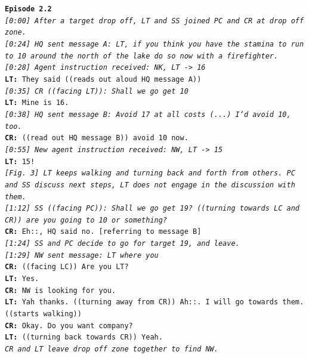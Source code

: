 \noindent\texttt{\textbf{Episode 2.2}\\
\emph{[0:00] After a target drop off, LT and SS joined PC and CR at drop off zone.} \\
\emph{ [0:24] HQ sent message A: LT, if you think you have the stamina to run to 10 around the north of the lake do so now with a firefighter. }\\
\emph{ [0:28] Agent instruction received:  NK, LT -> 16 }\\
\textbf{LT:} They said ((reads out aloud HQ message A)) \\
\emph{[0:35] CR ((facing LT)): Shall we go get 10}\\
\textbf{LT:} Mine is 16. \\
\emph{[0:38] HQ sent message B: Avoid 17 at all costs (...) I`d avoid 10, too.}\\
\textbf{CR:} ((read out HQ message B)) avoid 10 now. \\
\emph{[0:55] New agent instruction received: NW, LT -> 15}\\
\textbf{LT:} 15!\\
\emph{[Fig. 3] LT keeps walking and turning back and forth from others. PC and SS discuss next steps, LT does not engage in the discussion with them. }\\
\emph{[1:12] SS ((facing PC)): Shall we go get 19? ((turning towards LC and CR)) are you going to 10 or something? }\\
\textbf{CR:} Eh::, HQ said no. [referring to message B]\\
\emph{[1:24] SS and PC decide to go for target 19, and leave.}\\
\emph{[1:29] NW sent message: LT where you}\\
\textbf{CR:} ((facing LC)) Are you LT? \\
\textbf{LT:} Yes. \\
\textbf{CR:} NW is looking for you. \\ 
\textbf{LT:} Yah thanks. ((turning away from CR)) Ah::. I will go towards them.  ((starts walking)) \\
\textbf{CR:} Okay. Do you want company?\\
\textbf{LT:} ((turning back towards CR)) Yeah. \\
\emph{CR and LT leave drop off zone together to find NW.}\\
}

